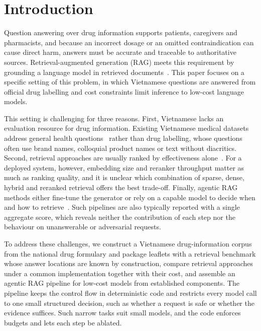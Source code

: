 \section{Introduction}\label{sec:introduction}

Question answering over drug information supports patients, caregivers and pharmacists, and because an incorrect dosage or an omitted contraindication can cause direct harm, answers must be accurate and traceable to authoritative sources. Retrieval-augmented generation (RAG) meets this requirement by grounding a language model in retrieved documents~\cite{lewis2020rag}. This paper focuses on a specific setting of this problem, in which Vietnamese questions are answered from official drug labelling and cost constraints limit inference to low-cost language models.

This setting is challenging for three reasons. First, Vietnamese lacks an evaluation resource for drug information. Existing Vietnamese medical datasets address general health questions~\cite{huy2021vimq,nguyen2022spbertqa,luu2021vicoqa} rather than drug labelling, whose questions often use brand names, colloquial product names or text without diacritics. Second, retrieval approaches are usually ranked by effectiveness alone~\cite{thakur2021beir,muennighoff2023mteb}. For a deployed system, however, embedding size and reranker throughput matter as much as ranking quality, and it is unclear which combination of sparse, dense, hybrid and reranked retrieval offers the best trade-off. Finally, agentic RAG methods either fine-tune the generator or rely on a capable model to decide when and how to retrieve~\cite{asai2024selfrag,yan2024crag,jeong2024adaptiverag}. Such pipelines are also typically reported with a single aggregate score, which reveals neither the contribution of each step nor the behaviour on unanswerable or adversarial requests.

To address these challenges, we construct a Vietnamese drug-information corpus from the national drug formulary and package leaflets with a retrieval benchmark whose answer locations are known by construction, compare retrieval approaches under a common implementation together with their cost, and assemble an agentic RAG pipeline for low-cost models from established components. The pipeline keeps the control flow in deterministic code and restricts every model call to one small structured decision, such as whether a request is safe or whether the evidence suffices. Such narrow tasks suit small models, and the code enforces budgets and lets each step be ablated.

